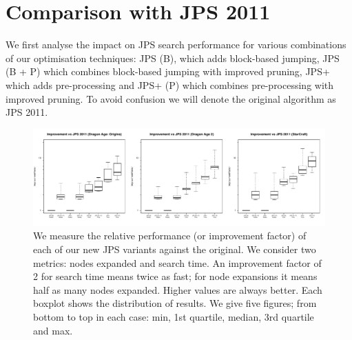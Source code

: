 

\section{Comparison with JPS 2011}
\label{sec::results}

We first analyse the impact on JPS search performance for various combinations
of our optimisation techniques: JPS (B), which adds block-based jumping, JPS
(B + P) which combines block-based jumping with improved pruning, JPS+ which
adds pre-processing and JPS+ (P) which combines pre-processing with improved
pruning.  To avoid confusion we will denote the original algorithm as JPS
2011.

\begin{figure} 
\begin{center}
		   \includegraphics[width=\columnwidth, trim = 0mm 0mm 0mm 0mm]
			{chapter_jps2/diagrams/improvement_vs_jps.pdf}
       \end{center}
\caption[Performance of improved JPS variants vs. original JPS] 
{\small We measure the relative performance (or improvement factor) of each of
our new JPS variants against the original. We consider two metrics: nodes
expanded and search time. An improvement factor of 2 for search time means
twice as fast; for node expansions it means half as many nodes expanded.
Higher values are always better. 
Each boxplot shows the distribution of results.
We give five figures; from
bottom to top in each case: min, 1st quartile, median, 3rd quartile and max.
}
\label{fig::jps2::vs_jps2011}
\end{figure}

